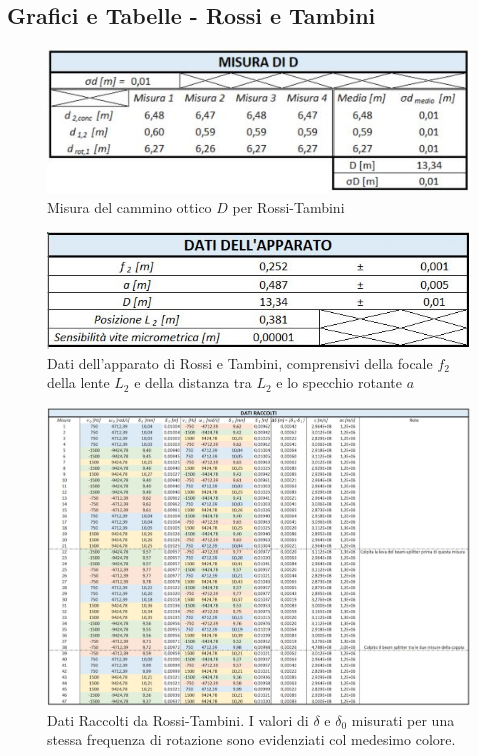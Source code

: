 \documentclass{article}
\begin{document}

\subsection{Grafici e Tabelle - Rossi e Tambini} \label{RT}

\begin{figure}[h]
    \centering
    \includegraphics[width=0.5\linewidth]{RT_D.JPG}
    \caption{Misura del cammino ottico $D$ per Rossi-Tambini}
    \label{RT_D}
\end{figure}

\begin{figure}[h]
    \centering
    \includegraphics[width=0.6\linewidth]{RT_Apparato.JPG}
    \caption{Dati dell'apparato di Rossi e Tambini, comprensivi della focale $f_2$ della lente $L_2$ e della distanza tra $L_2$ e lo specchio rotante $a$}
    \label{RT_Apparato}
\end{figure}

\begin{figure}[h!]
    \centering
    \includegraphics[width=1.02\linewidth]{RT_DatiRaccolti.JPG}
    \caption{Dati Raccolti da Rossi-Tambini. I valori di $\delta$ e $\delta_0$ misurati per una stessa frequenza di rotazione sono evidenziati col medesimo colore.}
    \label{RT_DatiRaccolti}
\end{figure}
\end{document}
